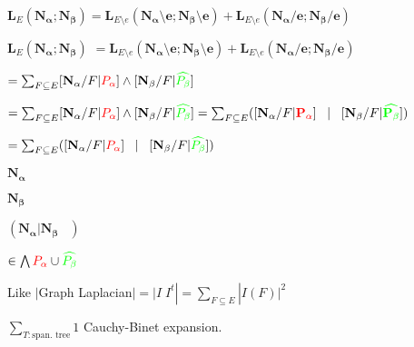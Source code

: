 \documentclass{beamer}
\begin{document}
\begin{frame}


  {
    \(
    \mathbf{L}_E(\mathbf{N_\alpha; N_\beta}) =
    \mathbf{L}_{E\setminus e}(\mathbf{N_\alpha\setminus e; N_\beta\setminus e})
    +
    \mathbf{L}_{E\setminus e}(\mathbf{N_\alpha/ e; N_\beta/ e})
    \)
  }

  {
    \(
    \mathbf{L}_E(\mathbf{N_\alpha; N_\beta})
    \)
  }
  {
    \(
    =
    \mathbf{L}_{E\setminus e}(\mathbf{N_\alpha\setminus e; N_\beta\setminus e})
    +
    \mathbf{L}_{E\setminus e}(\mathbf{N_\alpha/ e; N_\beta/ e})
    \)
  }




  {  \(
    =
    \sum_{F\subseteq E}[\mathbf{N_\alpha}/F|{\color{red}{P_\alpha}}]\wedge
        [\mathbf{N_\beta}/F|{\color{green}{\widehat{P_\beta}}}]
     \)
  }

  {  \(
    =
    \sum_{F\subseteq E}[\mathbf{N_\alpha}/F|{\color{red}{P_\alpha}}]\wedge
        [\mathbf{N_\beta}/F|{\color{green}{\widehat{P_\beta}}}]
        =
        \sum_{F\subseteq E}( [\mathbf{N_\alpha}/F|{\color{red}\mathbf{P_\alpha}}]
        \;\;\;|\;\;\; [\mathbf{N_\beta}/F|{\color{green}\mathbf{\widehat{P_\beta}}}] )
     \)
  }

  {
    \(
  =
        \sum_{F\subseteq E}( [\mathbf{N_\alpha}/F|{\color{red}{P_\alpha}}]
        \;\;\;|\;\;\; [\mathbf{N_\beta}/F|{\color{green}{\widehat{P_\beta}}}] )
     \)
  }


  { \( \displaystyle \mathbf{N_\alpha} \) }

    { \( \displaystyle \mathbf{N_\beta} \) }

  \( \displaystyle \left( \mathbf{N_\alpha} | \mathbf{N_\beta} \;\;\; \right) \)



  { \(
    \in
    \bigwedge {\color{red}{P_\alpha}} \cup {\color{green}{\widehat{P_\beta}}}
    \)
  }


  { Like $|$Graph Laplacian$|=|I\;I^t|=\sum_{F\subseteq E}|I(F)|^2$}
  
  {$\sum_{T:\text{span. tree}}1$ Cauchy-Binet expansion. }
  
    
    







  
\end{frame}
\end{document}
